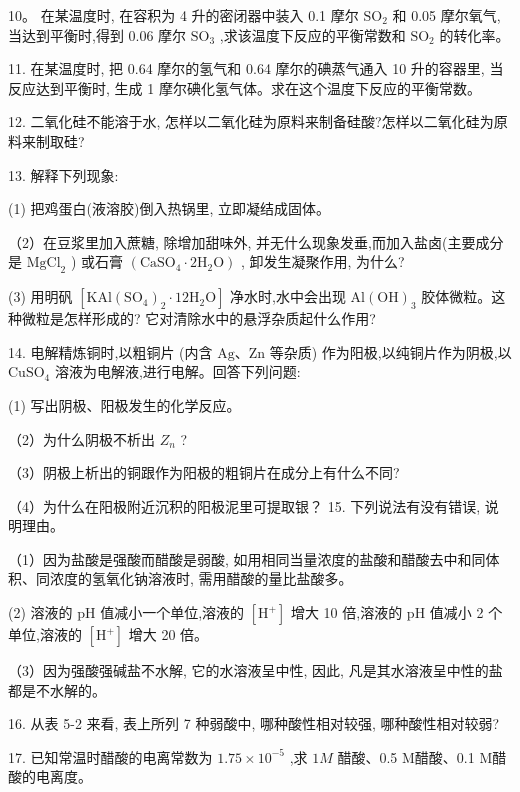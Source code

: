 \documentclass[10pt]{article}
\begin{document}
10。 在某温度时, 在容积为 4 升的密闭器中装入 0.1 摩尔 \({\mathrm{{SO}}}_{2}\) 和 0.05 摩尔氧气,当达到平衡时,得到 0.06 摩尔 \({\mathrm{{SO}}}_{3}\) ,求该温度下反应的平衡常数和 \({\mathrm{{SO}}}_{2}\) 的转化率。

11. 在某温度时, 把 0.64 摩尔的氢气和 0.64 摩尔的碘蒸气通入 10 升的容器里, 当反应达到平衡时, 生成 1 摩尔碘化氢气体。求在这个温度下反应的平衡常数。

12. 二氧化硅不能溶于水, 怎样以二氧化硅为原料来制备硅酸?怎样以二氧化硅为原料来制取硅?

13. 解释下列现象:

(1) 把鸡蛋白(液溶胶)倒入热锅里, 立即凝结成固体。

（2）在豆浆里加入蔗糖, 除增加甜味外, 并无什么现象发垂,而加入盐卤(主要成分是 \({\mathrm{{MgCl}}}_{2}\) ) 或石膏 \(\left( {{\mathrm{{CaSO}}}_{4} \cdot 2{\mathrm{H}}_{2}\mathrm{O}}\right)\) , 卸发生凝聚作用, 为什么?

(3) 用明矾 \(\left\lbrack {\mathrm{{KAl}}{\left( {\mathrm{{SO}}}_{4}\right) }_{2} \cdot {12}{\mathrm{H}}_{2}\mathrm{O}}\right\rbrack\) 净水时,水中会出现 \(\mathrm{{Al}}{\left( \mathrm{{OH}}\right) }_{3}\) 胶体微粒。这种微粒是怎样形成的? 它对清除水中的悬浮杂质起什么作用?

14. 电解精炼铜时,以粗铜片 (内含 \(\mathrm{{Ag}}\text{、}\mathrm{{Zn}}\) 等杂质) 作为阳极,以纯铜片作为阴极,以 \({\mathrm{{CuSO}}}_{4}\) 溶液为电解液,进行电解。回答下列问题:

(1) 写出阴极、阳极发生的化学反应。

（2）为什么阴极不析出 \({Z}_{n}\) ?

（3）阴极上析出的铜跟作为阳极的粗铜片在成分上有什么不同?

（4）为什么在阳极附近沉积的阳极泥里可提取银？ 15. 下列说法有没有错误, 说明理由。

（1）因为盐酸是强酸而醋酸是弱酸, 如用相同当量浓度的盐酸和醋酸去中和同体积、同浓度的氢氧化钠溶液时, 需用醋酸的量比盐酸多。

(2) 溶液的 \(\mathrm{{pH}}\) 值减小一个单位,溶液的 \(\left\lbrack {\mathrm{H}}^{ + }\right\rbrack\) 增大 10 倍,溶液的 \(\mathrm{{pH}}\) 值减小 2 个单位,溶液的 \(\left\lbrack {\mathrm{H}}^{ + }\right\rbrack\) 增大 20 倍。

（3）因为强酸强碱盐不水解, 它的水溶液呈中性, 因此, 凡是其水溶液呈中性的盐都是不水解的。

16. 从表 5-2 来看, 表上所列 7 种弱酸中, 哪种酸性相对较强, 哪种酸性相对较弱?

17. 已知常温时醋酸的电离常数为 \({1.75} \times {10}^{-5}\) ,求 \({1M}\) 醋酸、0.5 M醋酸、0.1 M醋酸的电离度。
\end{document}
